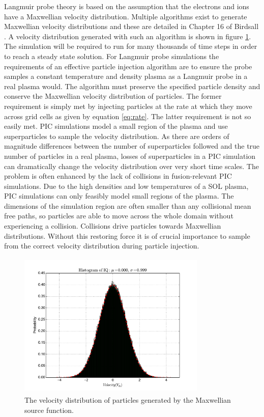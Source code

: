 Langmuir probe theory is based on the assumption that the electrons and ions have a Maxwellian velocity distribution. Multiple algorithms exist to generate Maxwellian velocity distributions  and these are detailed in Chapter 16 of Birdsall \cite{bible}. A velocity distribution generated with such an algorithm is shown in figure \ref{fig:maxwellian_initial}. The simulation will be required to run for many thousands of time steps in order to reach a steady state solution. For Langmuir probe simulations the requirements of an effective particle injection algorithm are to ensure the probe samples a constant temperature and density plasma as a Langmuir probe in a real plasma would. The algorithm must preserve the specified particle density and conserve the Maxwellian velocity distribution of particles. The former requirement is simply met by injecting particles at the rate at which they move across grid cells as given by equation \ref{eq:rate}. The latter requirement is not so easily met. PIC simulations model a small region of the plasma and use superparticles to sample the velocity distribution. As there are orders of magnitude differences between the number of superparticles followed and the true number of particles in a real plasma, losses of superparticles in a PIC simulation can dramatically change the velocity distribution over very short time scales. The problem is often enhanced by the lack of collisions in fusion-relevant PIC simulations. Due to the high densities and low temperatures of a SOL plasma, PIC simulations can only feasibly model small regions of the plasma. The dimensions of the simulation region are often smaller than any collisional mean free paths, so particles are able to move across the whole domain without experiencing a collision. Collisions drive particles towards Maxwellian distributions. Without this restoring force it is  of crucial importance to sample from the correct velocity distribution during particle injection. 
\begin{figure}[H]
\centering
\includegraphics[height=7cm,width=0.8\textwidth]{maxwellian_initial}
\caption{The velocity distribution of particles generated by the Maxwellian source function.}
\label{fig:maxwellian_initial}
\end{figure}
